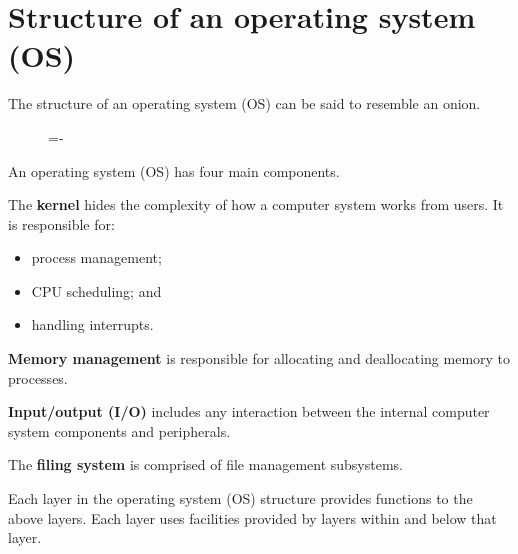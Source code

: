 \documentclass[a4paper]{systems-software}
\begin{document}
\section*{Structure of an operating system (OS)}

The structure of an operating system (OS) can be said to resemble an onion.

\begin{figure}[H]
  \lineskip=-\fboxrule
\end{figure}

An operating system (OS) has four main components.

The \textbf{kernel} hides the complexity of how a computer system works from users. It is responsible for:
\begin{itemize}
	\item process management;
	\item CPU scheduling; and
	\item handling interrupts.
\end{itemize}

\textbf{Memory management} is responsible for allocating and deallocating memory to processes.

\textbf{Input/output (I/O)} includes any interaction between the internal computer system components and peripherals.

The \textbf{filing system} is comprised of file management subsystems.

Each layer in the operating system (OS) structure provides functions to the above layers. Each layer uses facilities provided by layers within and below that layer. 
\end{document}
